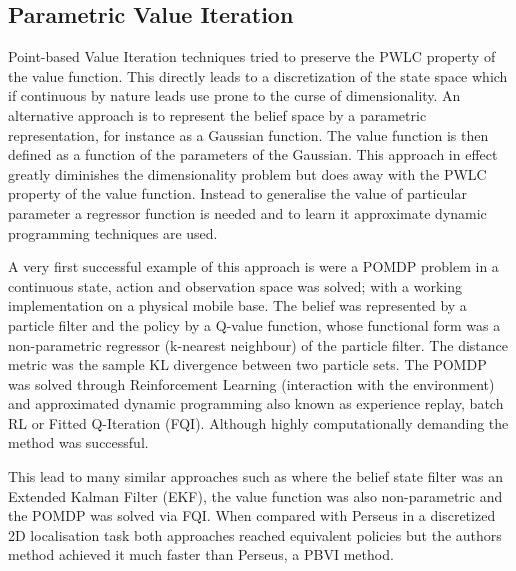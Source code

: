 


\subsection{Parametric Value Iteration}

Point-based Value Iteration techniques tried to preserve the PWLC property of the value function. This directly 
leads to a discretization of the state space which if continuous by nature leads use prone to the curse of dimensionality.
An alternative approach is to represent the belief space by a parametric representation, for instance as a Gaussian function. 
The value function is then defined as a function of the parameters of the Gaussian. This approach in effect greatly 
diminishes the dimensionality problem but does away with the PWLC property of the value function. Instead to generalise 
the value of particular parameter a regressor function is needed and to learn it approximate dynamic programming techniques 
are used.

A very first successful example of this approach is \cite{MC-POMDP} were a POMDP problem in a continuous 
state, action and observation space was solved; with a working implementation on a physical mobile base.  
The belief was represented by a particle filter and the policy by a Q-value function, whose functional form was 
a non-parametric regressor (k-nearest neighbour) of the particle filter. The distance metric was the sample KL divergence
between two particle sets. The POMDP was solved through Reinforcement Learning (interaction with the environment) and 
approximated dynamic programming also known as experience replay, batch RL or Fitted Q-Iteration (FQI)\cite{Tree_batch_2005}. 
Although highly computationally demanding the method was successful. 

This lead to many similar approaches such as \cite{mc_update_ppomdps} where the belief state filter was an 
Extended Kalman Filter (EKF), the value function was also non-parametric and the POMDP was solved via FQI. 
When compared with Perseus in a discretized 2D localisation task both approaches reached equivalent 
policies but the authors method achieved it much faster than Perseus, a PBVI method.

\cite{DRQ_AAAI_2015}
\cite{mnih-dqn-2015}
\cite{neura_fqi_2005}

